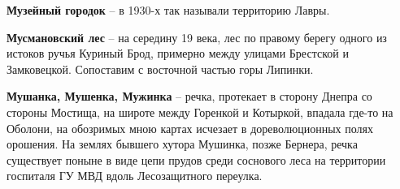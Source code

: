 \textbf{Музейный городок} – в 1930-х так называли территорию Лавры.\\

\medskip

\textbf{Мусмановский лес} – на середину 19 века, лес по правому берегу одного из истоков ручья Куриный Брод, примерно между улицами Брестской и Замковецкой. Сопоставим с восточной частью горы Липинки.\\


\medskip

\textbf{Мушанка, Мушенка, Мужинка} – речка, протекает в сторону Днепра со стороны Мостища, на широте между Горенкой и Котыркой, впадала где-то на Оболони, на обозримых мною картах исчезает в дореволюционных полях орошения. На землях бывшего хутора Мушинка, позже Бернера, речка существует поныне в виде цепи прудов среди соснового леса на территории госпиталя ГУ МВД вдоль Лесозащитного переулка.
